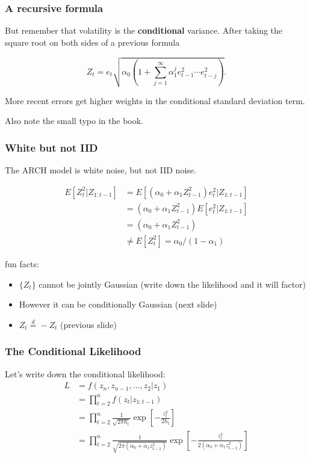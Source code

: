 \documentclass{beamer}
\begin{document}
\begin{frame}
\frametitle{A recursive formula}

But remember that volatility is the {\bf conditional} variance. After taking the square root on both sides of a previous formula

\begin{block}{}
\[
Z_t = e_t \sqrt{\alpha_0\left(1 +  \sum_{j=1}^{\infty} \alpha_1^j e_{t-1}^2 \cdots e_{t-j}^2\right) }.
\]
\end{block}
More recent errors get higher weights in the conditional standard deviation term.
\newline

Also note the small typo in the book.

\end{frame}


\begin{frame}
\frametitle{White but not IID}

The ARCH model is white noise, but not IID noise. 

\begin{align*}
E[Z_t^2|Z_{1:t-1}] &= E[(\alpha_0 + \alpha_1 Z_{t-1}^2)e_t^2|Z_{1:t-1}] \\
&= (\alpha_0 + \alpha_1 Z_{t-1}^2) E[e_t^2|Z_{1:t-1}]\\
&= (\alpha_0 + \alpha_1 Z_{t-1}^2) \\
&\neq E[Z_t^2] = \alpha_0 / (1- \alpha_1)
\end{align*}

fun facts:
\begin{itemize}
\item $\{Z_t\}$ cannot be jointly Gaussian (write down the likelihood and it will factor)
\item However it can be conditionally Gaussian (next slide)
\item $Z_t \overset{d}{=} -Z_t$ (previous slide)
\end{itemize}

\end{frame}


\begin{frame}
\frametitle{The Conditional Likelihood}

Let's write down the conditional likelihood:
\begin{align*}
L &= f(z_n, z_{n-1},\ldots,z_2 |z_1) \\
&= \prod_{t=2}^n f(z_t|z_{1:t-1}) \\
&= \prod_{t=2}^n \frac{1}{\sqrt{2 \pi h_t } } \exp\left[- \frac{z_t^2}{2 h_t } \right] \tag{cndtl nrmlty} \\ 
&= \prod_{t=2}^n \frac{1}{\sqrt{2 \pi (\alpha_0 + \alpha_1 z_{t-1}^2) } } \exp\left[- \frac{z_t^2}{2(\alpha_0 + \alpha_1 z_{t-1}^2)  } \right] \tag{defn. $h_t$}
\end{align*}

\end{frame}
\end{document}
